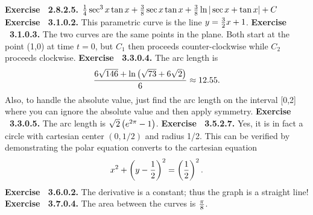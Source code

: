  {\noindent \protect \bf  Exercise ~2.8.2.5.} $\protect \frac  {1}{4}\protect \qopname  \relax o{sec}^3{x}\protect \qopname  \relax o{tan}{x} +\protect \frac  {3}{8} \protect \qopname  \relax o{sec}{x}\protect \qopname  \relax o{tan}{x}+\protect \frac  {3}{8} \protect \qopname  \relax o{ln}{|\protect \qopname  \relax o{sec}{x}+\protect \qopname  \relax o{tan}{x}|}+C$ \protect \newline  \protect \newline  
 {\noindent \protect \bf  Exercise ~3.1.0.2.} This parametric curve is the line $y=\protect \frac  {3}{2}x+1$. \protect \newline  \protect \newline  
 {\noindent \protect \bf  Exercise ~3.1.0.3.} The two curves are the same points in the plane. Both start at the point (1,0) at time $t=0$, but $C_1$ then proceeds counter-clockwise while $C_2$ proceeds clockwise. \protect \newline  \protect \newline  
 {\noindent \protect \bf  Exercise ~3.3.0.4.} The arc length is $$\protect \frac  {6\protect \sqrt  {146}+\protect \qopname  \relax o{ln}\left (\protect \sqrt  {73}+6\protect \sqrt  {2}\right )}{6}\approx 12.55.$$ Also, to handle the absolute value, just find the arc length on the interval [0,2] where you can ignore the absolute value and then apply symmetry. \protect \newline  \protect \newline  
 {\noindent \protect \bf  Exercise ~3.3.0.5.} The arc length is $\protect \sqrt  {2}\left (e^{2\pi }-1\right )$. \protect \newline  \protect \newline  
 {\noindent \protect \bf  Exercise ~3.5.2.7.} Yes, it is in fact a circle with cartesian center $\left (0,1/2\right )$ and radius 1/2. This can be verified by demonstrating the polar equation converts to the cartesian equation $$x^2+\left (y-\protect \frac  {1}{2}\right )^2=\left (\protect \frac  {1}{2}\right )^2. $$ \protect \newline  \protect \newline  
 {\noindent \protect \bf  Exercise ~3.6.0.2.} The derivative is a constant; thus the graph is a straight line! \protect \newline  \protect \newline  
 {\noindent \protect \bf  Exercise ~3.7.0.4.} The area between the curves is $\protect \frac  {\pi }{8}$. \protect \newline  \protect \newline  
